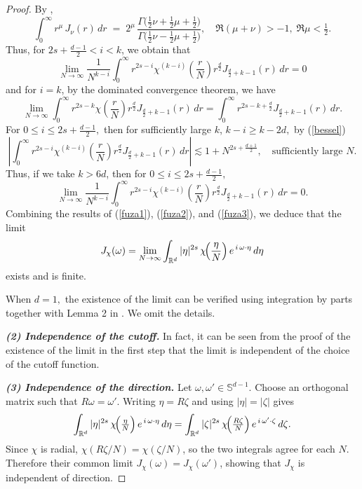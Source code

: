 \documentclass[reqno,12pt]{amsart}
\numberwithin{equation}{section}
\begin{document}
\begin{proof}
	By \cite[p.243]{olver2010nist},
	\[
	\int_{0}^{\infty} r^{\mu} \, J_{\nu}(r)\,dr
	\;=\;
	2^{\mu}\,
	\frac{\Gamma\!\bigl(\tfrac12\nu+\tfrac12\mu+\tfrac12\bigr)}
	{\Gamma\!\bigl(\tfrac12\nu-\tfrac12\mu+\tfrac12\bigr)},
	\quad
	\Re(\mu+\nu)>-1,\;\Re\mu<\tfrac12.
	\]
	Thus, for $2s+\frac{d-1}{2}<i< k$, we obtain that
	\begin{equation}\label{fuza1}
		\lim\limits_{N\rightarrow \infty}\frac{1}{N^{k-i}}\int_0^{\infty}r^{2s-i}\chi^{(k-i)}\left(\frac{r}{N}\right)r^{\frac{d}{2}}J_{\frac{d}{2}+k-1}(r)\,dr=0
	\end{equation}
	and for $i=k$, by the dominated convergence theorem, we have
	\begin{equation}\label{fuza2}
		\lim\limits_{N\rightarrow \infty}\int_0^{\infty}r^{2s-k}\chi\left(\frac{r}{N}\right)r^{\frac{d}{2}}J_{\frac{d}{2}+k-1}(r)\,dr=\int_0^{\infty}r^{2s-k+\frac{d}{2}}J_{\frac{d}{2}+k-1}(r)\,dr.
	\end{equation}
	For $0 \le i \le 2s+\frac{d-1}{2},$ then for sufficiently large $k$, $k-i\ge k-2d,$ by (\ref{bessel})
	\[\left|\int_0^{\infty}r^{2s-i}\chi^{(k-i)}\left(\frac{r}{N}\right)r^{\frac{d}{2}}J_{\frac{d}{2}+k-1}(r)\,dr\right|\lesssim 1+N^{2s+\frac{d+1}{2}},\quad \text{sufficiently large $N$.}\]
	Thus, if we take $k>6d$, then for  $0 \le i \le 2s+\frac{d-1}{2},$
	\begin{equation}\label{fuza3}
		\lim\limits_{N\rightarrow \infty}\frac{1}{N^{k-i}}\int_0^{\infty}r^{2s-i}\chi^{(k-i)}\left(\frac{r}{N}\right)r^{\frac{d}{2}}J_{\frac{d}{2}+k-1}(r)\,dr=0.
	\end{equation}
	Combining the results of (\ref{fuza1}), (\ref{fuza2}), and (\ref{fuza3}), we deduce that the limit
	\[J_\chi(\omega)=\lim_{N\to\infty}
	\int_{\mathbb{R}^d}|\eta|^{2s}\,\chi\!\Bigl(\frac{\eta}{N}\Bigr)\,e^{\,i\,\omega\cdot\eta}\,d\eta\]
	exists and is finite.
	
	When $d = 1,$ the existence of the limit can be verified using integration by parts together with Lemma 2 in \cite[Chapter V]{stein1970singular}. We omit the details.
	
	
	\textbf{\emph{(2) Independence of the cutoff.}} In fact, it can be seen from the proof of the existence of the limit in the first step that  the limit is independent of the choice of the cutoff function.
	
	\textbf{\emph{(3) Independence of the direction.}}  Let \(\omega,\omega'\in\mathbb S^{d-1}\).  Choose an orthogonal matrix such that \(R\omega=\omega'\).  Writing \(\eta=R\zeta\) and using \(|\eta|=|\zeta|\) gives
	\[
	\int_{\mathbb{R}^d}|\eta|^{2s}\,\chi\!\Bigl(\tfrac\eta N\Bigr)\,e^{\,i\,\omega\cdot\eta}\,d\eta
	=\int_{\mathbb{R}^d}|\zeta|^{2s}\,\chi\!\Bigl(\tfrac{R\zeta}{N}\Bigr)\,e^{\,i\,\omega'\cdot\zeta}\,d\zeta.
	\]
	Since \(\chi\) is radial, \(\chi(R\zeta/N)=\chi(\zeta/N)\), so the two integrals agree for each \(N\).  Therefore their common limit
	\(\displaystyle J_\chi(\omega)=J_\chi(\omega')\),
	showing that \(J_\chi\) is independent of direction.
\end{proof}
\end{document}
